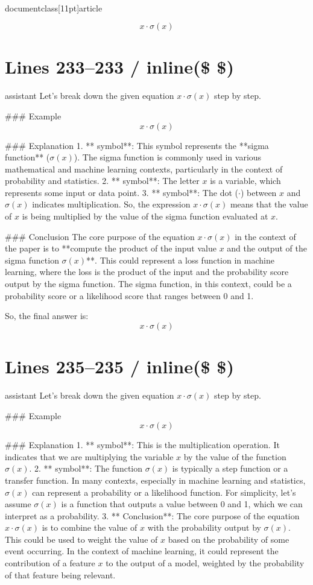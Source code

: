 \\documentclass[11pt]{article}
\begin{document}
\[
\boxed{x \cdot \sigma(x)}
\]


\section*{Lines 233–233 / inline(\$ \$) }
assistant
Let's break down the given equation \( x \cdot \sigma(x) \) step by step.

### Example
\[ x \cdot \sigma(x) \]

### Explanation
1. ** symbol**: This symbol represents the **sigma function** (\(\sigma(x)\)). The sigma function is commonly used in various mathematical and machine learning contexts, particularly in the context of probability and statistics.
2. ** symbol**: The letter \(x\) is a variable, which represents some input or data point.
3. ** symbol**: The dot (\(\cdot\)) between \(x\) and \(\sigma(x)\) indicates multiplication. So, the expression \(x \cdot \sigma(x)\) means that the value of \(x\) is being multiplied by the value of the sigma function evaluated at \(x\).

### Conclusion
The core purpose of the equation \(x \cdot \sigma(x)\) in the context of the paper is to **compute the product of the input value \(x\) and the output of the sigma function \(\sigma(x)\)**. This could represent a loss function in machine learning, where the loss is the product of the input and the probability score output by the sigma function. The sigma function, in this context, could be a probability score or a likelihood score that ranges between 0 and 1.

So, the final answer is:
\[ \boxed{x \cdot \sigma(x)} \]


\section*{Lines 235–235 / inline(\$ \$) }
assistant
Let's break down the given equation \( x \cdot \sigma(x) \) step by step.

### Example
\[ x \cdot \sigma(x) \]

### Explanation
1. ** symbol**: This is the multiplication operation. It indicates that we are multiplying the variable \( x \) by the value of the function \( \sigma(x) \).
2. ** symbol**: The function \( \sigma(x) \) is typically a step function or a transfer function. In many contexts, especially in machine learning and statistics, \( \sigma(x) \) can represent a probability or a likelihood function. For simplicity, let's assume \( \sigma(x) \) is a function that outputs a value between 0 and 1, which we can interpret as a probability.
3. ** Conclusion**: The core purpose of the equation \( x \cdot \sigma(x) \) is to combine the value of \( x \) with the probability output by \( \sigma(x) \). This could be used to weight the value of \( x \) based on the probability of some event occurring. In the context of machine learning, it could represent the contribution of a feature \( x \) to the output of a model, weighted by the probability of that feature being relevant.
\end{document}
